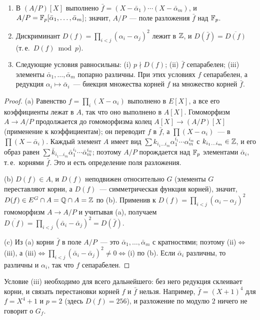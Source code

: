 \begin{lemma}[4.27c]
\begin{enumerate}[label=\textup{(\alph*)}]
\item В $(A/P)[X]$ выполнено $\bar f=(X-\bar\alpha_1)\cdots(X-\bar\alpha_m)$, и $A/P=\mathbb F_p[\bar\alpha_1,\dots,\bar\alpha_m]$;
значит, $A/P$~--- поле разложения $\bar f$ над $\mathbb F_p$.
\item Дискриминант $D(f)=\prod_{i<j}(\alpha_i-\alpha_j)^2$ лежит в $\mathbb Z$, и $D(\bar f)=\overline{D(f)}$ (т.\,е.\
$D(f)\bmod p$).
\item Следующие условия равносильны: \textup{(i)} $p\nmid D(f)$; \textup{(ii)} $\bar f$ сепарабелен; \textup{(iii)}
элементы $\bar\alpha_1,\dots,\bar\alpha_m$ попарно различны. При этих условиях $f$ сепарабелен, а редукция
$\alpha_i\mapsto\bar\alpha_i$~--- биекция множества корней $f$ на множество корней $\bar f$.
\end{enumerate}
\end{lemma}

\begin{proof}
(a) Равенство $f=\prod_i(X-\alpha_i)$ выполнено в $E[X]$, а все его коэффициенты лежат в $A$, так что оно выполнено в
$A[X]$. Гомоморфизм $A\to A/P$ продолжается до гомоморфизма колец $A[X]\to(A/P)[X]$ (применение к коэффициентам);
он переводит $f$ в $\bar f$, а $\prod(X-\alpha_i)$~--- в $\prod(X-\bar\alpha_i)$. Каждый элемент $A$ имеет вид
$\sum k_{i_1\dots i_m}\alpha_1^{i_1}\cdots\alpha_m^{i_m}$ с $k_{i_1\dots i_m}\in\mathbb Z$, и его образ равен
$\sum\bar k_{i_1\dots i_m}\bar\alpha_1^{i_1}\cdots\bar\alpha_m^{i_m}$; поэтому $A/P$ порождается над $\mathbb F_p$ элементами
$\bar\alpha_i$, т.\,е.\ корнями $\bar f$. Это и есть определение поля разложения.

(b) $D(f)\in A$, и $D(f)$ неподвижен относительно $G$ (элементы $G$ переставляют корни, а $D(f)$~--- симметрическая функция
корней), значит, $D(f)\in E^G\cap A=\mathbb Q\cap A=\mathbb Z$ по \rf{4.27b}(b). Применив к $D(f)=\prod_{i<j}(\alpha_i-\alpha_j)^2$
гомоморфизм $A\to A/P$ и учитывая (a), получаем $\overline{D(f)}=\prod_{i<j}(\bar\alpha_i-\bar\alpha_j)^2=D(\bar f)$.

(c) Из (a) корни $\bar f$ в поле $A/P$~--- это $\bar\alpha_1,\dots,\bar\alpha_m$ с кратностями; поэтому (ii)$\iff$(iii), а
(iii)$\iff\prod_{i<j}(\bar\alpha_i-\bar\alpha_j)^2\ne0\iff$(i) по (b). Если $\bar\alpha_i$ различны, то различны и $\alpha_i$,
так что $f$ сепарабелен.
\end{proof}

Условие (iii) необходимо для всего дальнейшего: без него редукция склеивает корни, и связать перестановки корней $f$ и
$\bar f$ нельзя. Например, $\bar f=(X+1)^4$ для $f=X^4+1$ и $p=2$ (здесь $D(f)=256$), и разложение по модулю $2$ ничего
не говорит о $G_f$.

